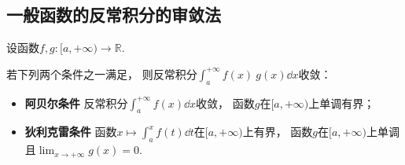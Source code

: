 \subsection{一般函数的反常积分的审敛法}
\begin{theorem}\label{theorem:反常积分.无穷限的反常积分的阿贝尔--狄利克雷审敛法}
设函数\(f,g\colon[a,+\infty)\to\mathbb{R}\).

若下列两个条件之一满足，
则反常积分\(\int_a^{+\infty} f(x) ~ g(x) \dd{x}\)收敛：\begin{itemize}
	\item {\rm\bf 阿贝尔条件}
	反常积分\(\int_a^{+\infty} f(x) \dd{x}\)收敛，
	函数\(g\)在\([a,+\infty)\)上单调有界；

	\item {\rm\bf 狄利克雷条件}
	函数\(x \mapsto \int_a^x f(t) \dd{t}\)在\([a,+\infty)\)上有界，
	函数\(g\)在\([a,+\infty)\)上单调且\(\lim_{x\to+\infty} g(x) = 0\).
\end{itemize}
\end{theorem}

